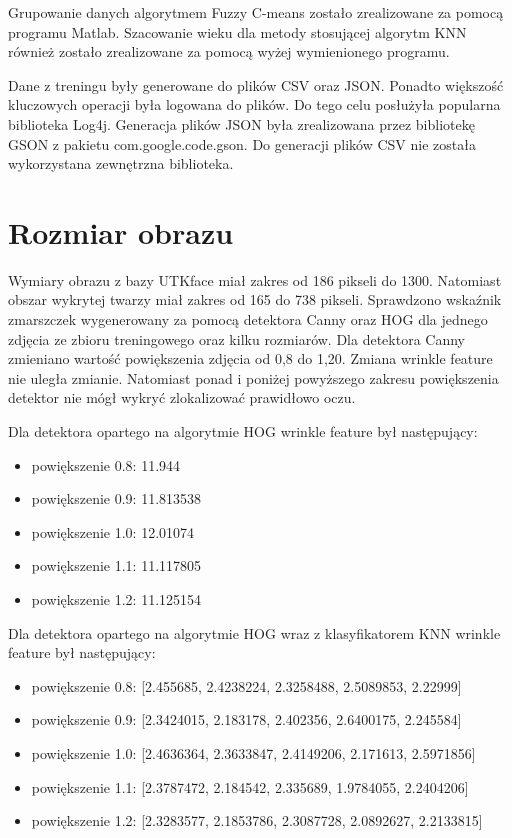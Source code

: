 \documentclass[a4paper,twoside,12pt]{book}
\begin{document}
    Grupowanie danych algorytmem Fuzzy C-means zostało zrealizowane za pomocą programu Matlab.
    Szacowanie wieku dla metody stosującej algorytm KNN również zostało zrealizowane za pomocą wyżej wymienionego
    programu.

    Dane z treningu były generowane do plików CSV oraz JSON. Ponadto większość kluczowych operacji była logowana do plików. Do
    tego celu posłużyła popularna biblioteka Log4j.
    Generacja plików JSON była zrealizowana przez bibliotekę GSON z pakietu com.google.code.gson.
    Do generacji plików CSV nie została wykorzystana zewnętrzna biblioteka.

    \section{Rozmiar obrazu}\label{sec:rozmiar-obrazu}
    Wymiary obrazu z bazy UTKface miał zakres od 186 pikseli do 1300. Natomiast obszar wykrytej
    twarzy miał zakres od 165 do 738 pikseli.
    Sprawdzono wskaźnik zmarszczek wygenerowany za pomocą detektora Canny oraz HOG dla jednego zdjęcia ze zbioru
    treningowego oraz kilku rozmiarów.
    Dla detektora Canny zmieniano wartość powiększenia zdjęcia od 0,8 do 1,20. Zmiana wrinkle feature nie uległa
    zmianie. Natomiast ponad i poniżej powyższego zakresu powiększenia detektor nie mógł wykryć zlokalizować prawidłowo
    oczu.

    Dla detektora opartego na algorytmie HOG wrinkle feature był następujący:
    \begin{itemize}
        \item powiększenie 0.8: 11.944
        \item powiększenie 0.9: 11.813538
        \item powiększenie 1.0: 12.01074
        \item powiększenie 1.1: 11.117805
        \item powiększenie 1.2: 11.125154
    \end{itemize}

    Dla detektora opartego na algorytmie HOG wraz z klasyfikatorem KNN wrinkle feature był następujący:

    \begin{itemize}
        \item powiększenie 0.8: [2.455685, 2.4238224, 2.3258488, 2.5089853, 2.22999]
        \item powiększenie 0.9: [2.3424015, 2.183178, 2.402356, 2.6400175, 2.245584]
        \item powiększenie 1.0: [2.4636364, 2.3633847, 2.4149206, 2.171613, 2.5971856]
        \item powiększenie 1.1: [2.3787472, 2.184542, 2.335689, 1.9784055, 2.2404206]
        \item powiększenie 1.2: [2.3283577, 2.1853786, 2.3087728, 2.0892627, 2.2133815]
    \end{itemize}
\end{document}
